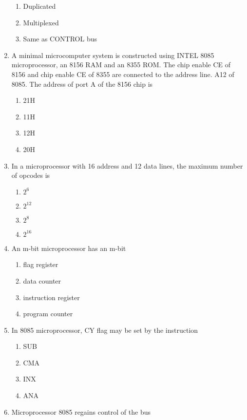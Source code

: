 \documentclass[journal,12pt,twocolumn]{IEEEtran}
\begin{document}
\begin{enumerate}
\begin{enumerate}
      \item Duplicated
      \item  Multiplexed 
      \item Same as CONTROL bus
    \end{enumerate}
    \item A minimal microcomputer system is constructed using INTEL 8085 microprocessor, an
8156 RAM and an 8355 ROM. The chip enable CE of 8156 and chip enable CE of 8355 are
connected to the address line. A12 of 8085. The address of port A of the 8156 chip is\\
     \begin{enumerate}
      \item 21H 
      \item 11H
      \item 12H
      \item 20H
    \end{enumerate}
    \item In a microprocessor with 16 address and 12 data lines, the maximum number of opcodes is\\
    \begin{enumerate}
      \item $2^{6}$  
      \item $2^{12}$  
      \item $2^{8}$ 
      \item $2^{16}$
    \end{enumerate}
    \item An m-bit microprocessor has an m-bit
     \begin{enumerate}
      \item flag register 
      \item data counter
      \item instruction register
      \item  program counter
    \end{enumerate}
    \item In 8085 microprocessor, CY flag may be set by the instruction\\
     \begin{enumerate}
      \item SUB 
      \item CMA
      \item INX
      \item ANA
    \end{enumerate}
    \item Microprocessor 8085 regains control of the bus\\

\end{enumerate}
\end{document}
